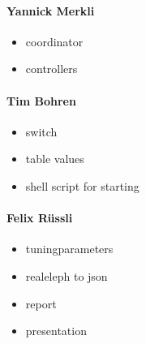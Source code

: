 \documentclass[11pt,oneside,a4paper]{article}
\begin{document}
\paragraph{Yannick Merkli}
\begin{itemize}
	\item coordinator
	\item controllers
\end{itemize}


\paragraph{Tim Bohren}
\begin{itemize}
	\item switch
	\item table values
	\item shell script for starting
\end{itemize}

\paragraph{Felix Rüssli}
\begin{itemize}
	\item tuningparameters
	\item realeleph to json
	\item report
	\item presentation
\end{itemize}
\end{document}
